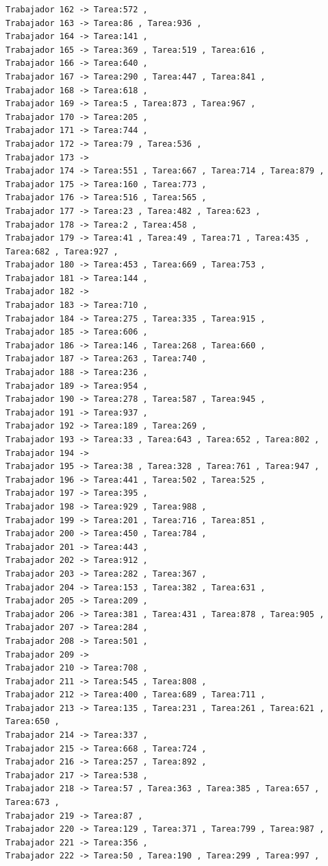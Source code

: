\documentclass{article}
\begin{document}
\begin{lstlisting}
Trabajador 162 -> Tarea:572 , 
Trabajador 163 -> Tarea:86 , Tarea:936 , 
Trabajador 164 -> Tarea:141 , 
Trabajador 165 -> Tarea:369 , Tarea:519 , Tarea:616 , 
Trabajador 166 -> Tarea:640 , 
Trabajador 167 -> Tarea:290 , Tarea:447 , Tarea:841 , 
Trabajador 168 -> Tarea:618 , 
Trabajador 169 -> Tarea:5 , Tarea:873 , Tarea:967 , 
Trabajador 170 -> Tarea:205 , 
Trabajador 171 -> Tarea:744 , 
Trabajador 172 -> Tarea:79 , Tarea:536 , 
Trabajador 173 -> 
Trabajador 174 -> Tarea:551 , Tarea:667 , Tarea:714 , Tarea:879 , 
Trabajador 175 -> Tarea:160 , Tarea:773 , 
Trabajador 176 -> Tarea:516 , Tarea:565 , 
Trabajador 177 -> Tarea:23 , Tarea:482 , Tarea:623 , 
Trabajador 178 -> Tarea:2 , Tarea:458 , 
Trabajador 179 -> Tarea:41 , Tarea:49 , Tarea:71 , Tarea:435 , Tarea:682 , Tarea:927 , 
Trabajador 180 -> Tarea:453 , Tarea:669 , Tarea:753 , 
Trabajador 181 -> Tarea:144 , 
Trabajador 182 -> 
Trabajador 183 -> Tarea:710 , 
Trabajador 184 -> Tarea:275 , Tarea:335 , Tarea:915 , 
Trabajador 185 -> Tarea:606 , 
Trabajador 186 -> Tarea:146 , Tarea:268 , Tarea:660 , 
Trabajador 187 -> Tarea:263 , Tarea:740 , 
Trabajador 188 -> Tarea:236 , 
Trabajador 189 -> Tarea:954 , 
Trabajador 190 -> Tarea:278 , Tarea:587 , Tarea:945 , 
Trabajador 191 -> Tarea:937 , 
Trabajador 192 -> Tarea:189 , Tarea:269 , 
Trabajador 193 -> Tarea:33 , Tarea:643 , Tarea:652 , Tarea:802 , 
Trabajador 194 -> 
Trabajador 195 -> Tarea:38 , Tarea:328 , Tarea:761 , Tarea:947 , 
Trabajador 196 -> Tarea:441 , Tarea:502 , Tarea:525 , 
Trabajador 197 -> Tarea:395 , 
Trabajador 198 -> Tarea:929 , Tarea:988 , 
Trabajador 199 -> Tarea:201 , Tarea:716 , Tarea:851 , 
Trabajador 200 -> Tarea:450 , Tarea:784 , 
Trabajador 201 -> Tarea:443 , 
Trabajador 202 -> Tarea:912 , 
Trabajador 203 -> Tarea:282 , Tarea:367 , 
Trabajador 204 -> Tarea:153 , Tarea:382 , Tarea:631 , 
Trabajador 205 -> Tarea:209 , 
Trabajador 206 -> Tarea:381 , Tarea:431 , Tarea:878 , Tarea:905 , 
Trabajador 207 -> Tarea:284 , 
Trabajador 208 -> Tarea:501 , 
Trabajador 209 -> 
Trabajador 210 -> Tarea:708 , 
Trabajador 211 -> Tarea:545 , Tarea:808 , 
Trabajador 212 -> Tarea:400 , Tarea:689 , Tarea:711 , 
Trabajador 213 -> Tarea:135 , Tarea:231 , Tarea:261 , Tarea:621 , Tarea:650 , 
Trabajador 214 -> Tarea:337 , 
Trabajador 215 -> Tarea:668 , Tarea:724 , 
Trabajador 216 -> Tarea:257 , Tarea:892 , 
Trabajador 217 -> Tarea:538 , 
Trabajador 218 -> Tarea:57 , Tarea:363 , Tarea:385 , Tarea:657 , Tarea:673 , 
Trabajador 219 -> Tarea:87 , 
Trabajador 220 -> Tarea:129 , Tarea:371 , Tarea:799 , Tarea:987 , 
Trabajador 221 -> Tarea:356 , 
Trabajador 222 -> Tarea:50 , Tarea:190 , Tarea:299 , Tarea:997 , 

\end{lstlisting}
\end{document}
